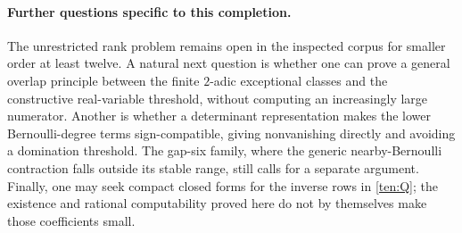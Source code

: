 \paragraph{Further questions specific to this completion.}
The unrestricted rank problem remains open in the inspected corpus
for smaller order at least twelve.  A natural next question is whether
one can prove a general overlap principle between the finite
$2$-adic exceptional classes and the constructive real-variable
threshold, without computing an increasingly large numerator.
Another is whether a determinant representation makes the lower
Bernoulli-degree terms sign-compatible, giving nonvanishing directly
and avoiding a domination threshold.  The gap-six family, where the
generic nearby-Bernoulli contraction falls outside its stable range,
still calls for a separate argument.  Finally, one may seek compact
closed forms for the inverse rows in \eqref{ten:Q}; the existence
and rational computability proved here do not by themselves make
those coefficients small.
